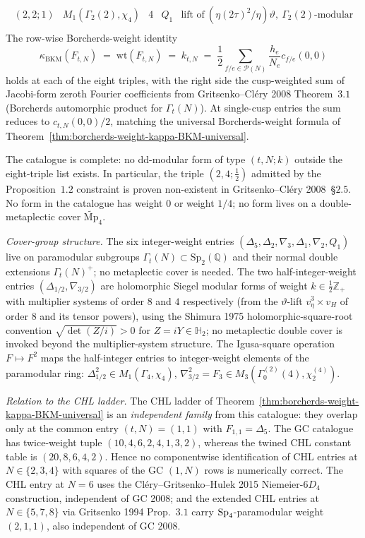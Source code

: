\begin{theorem}
\[\begin{array}{c|c|c|l|l}
 (2, 2; 1) & M_1(\Gamma_2(2), \chi_4) & 4 & Q_1 & \text{lift of}\ (\eta(2\tau)^2/\eta) \vartheta,\ \Gamma_2(2)\text{-modular} \\
\end{array}
\]
The row-wise Borcherds-weight identity
\[
 \kappa_{\mathrm{BKM}}(F_{t, N}) \;=\; \mathrm{wt}(F_{t, N}) \;=\; k_{t, N}
 \;=\; \frac{1}{2} \sum_{f/e \in \mathcal{P}(N)} \frac{h_e}{N_e}
 c_{f/e}(0, 0)
\]
holds at each of the eight triples, with the right side the
cusp-weighted sum of Jacobi-form zeroth Fourier coefficients from
Gritsenko--Cl\'ery 2008 Theorem~$3.1$ (Borcherds automorphic product
for $\Gamma_t(N)$). At single-cusp entries the sum reduces to
$c_{t, N}(0, 0) / 2$, matching the universal Borcherds-weight formula
of Theorem~\ref{thm:borcherds-weight-kappa-BKM-universal}.

The catalogue is complete: no dd-modular form of type $(t, N; k)$
outside the eight-triple list exists. In particular, the triple
$(2, 4; \tfrac{1}{2})$ admitted by the Proposition~$1.2$ constraint
is proven non-existent in Gritsenko--Cl\'ery 2008~\S$2.5$. No form in
the catalogue has weight $0$ or weight $1/4$; no form lives on a
double-metaplectic cover $\widetilde{\mathrm{Mp}}_4$.

\emph{Cover-group structure.} The six integer-weight entries
$(\Delta_5, \Delta_2, \nabla_3, \Delta_1, \nabla_2, Q_1)$ live on
paramodular subgroups $\Gamma_t(N) \subset \mathrm{Sp}_2(\mathbb{Q})$
and their normal double extensions $\Gamma_t(N)^+$; no metaplectic
cover is needed. The two half-integer-weight entries
$(\Delta_{1/2}, \nabla_{3/2})$ are holomorphic Siegel modular forms
of weight $k \in \tfrac{1}{2}\mathbb{Z}_+$ with multiplier systems of
order $8$ and $4$ respectively (from the $\vartheta$-lift
$v_\eta^3 \times v_H$ of order $8$ and its tensor powers), using the
Shimura 1975 holomorphic-square-root convention
$\sqrt{\det(Z/i)} > 0$ for $Z = iY \in \mathbb{H}_2$; no metaplectic
double cover is invoked beyond the multiplier-system structure. The
Igusa-square operation
$F \mapsto F^2$ maps the half-integer entries to integer-weight
elements of the paramodular ring: $\Delta_{1/2}^2 \in M_1(\Gamma_4,
\chi_4)$, $\nabla_{3/2}^2 = F_3 \in M_3(\Gamma_0^{(2)}(4), \chi_2^{(4)})$.

\emph{Relation to the CHL ladder.} The CHL ladder of
Theorem~\ref{thm:borcherds-weight-kappa-BKM-universal} is an
\emph{independent family} from this catalogue: they overlap only at
the common entry $(t, N) = (1, 1)$ with $F_{1, 1} = \Delta_5$. The GC
catalogue has twice-weight tuple $(10,4,6,2,4,1,3,2)$, whereas the
twined CHL constant table is $(20,8,6,4,2)$. Hence no componentwise identification
of CHL entries at $N \in \{2,3,4\}$ with squares of the GC $(1,N)$ rows
is numerically correct. The CHL entry at $N = 6$ uses the
Cl\'ery--Gritsenko--Hulek 2015 Niemeier-$6D_4$ construction, independent
of GC 2008; and the extended CHL entries at $N \in \{5, 7, 8\}$ via
Gritsenko 1994 Prop.~$3.1$ carry $\mathrm{Sp}_4$-paramodular weight
$(2, 1, 1)$, also independent of GC 2008.
\end{theorem}

